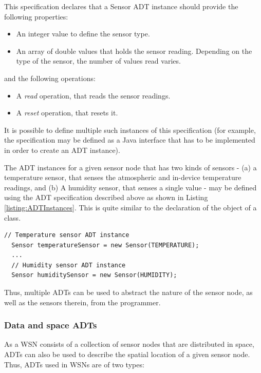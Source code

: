 This specification declares that a Sensor ADT instance should provide the
following properties:
\begin{itemize}
\item An integer value to define the sensor type.   
\item An array of double values that holds the sensor reading. Depending on the
type of the sensor, the number of values read varies.
\end{itemize}

and the following operations:
\begin{itemize}
  \item A \emph{read} operation, that reads the sensor readings.
  \item A \emph{reset} operation, that resets it.
\end{itemize}

It is possible to define multiple such instances of this specification (for
example, the specification may be defined as a Java interface that has to
be implemented in order to create an ADT instance).

The ADT instances for a given sensor node that has two kinds of
sensors - (a) a temperature sensor, that senses the atmospheric and in-device
  temperature readings, and (b) A humidity sensor, that senses a single value -
  may be defined using the ADT specification described above as shown in
  Listing \ref{listing:ADTInstances}. This is quite similar to the declaration
  of the object of a class.  

\begin{lstlisting}[frame=trbl, basewidth={0.55em, 0.6em}, captionpos=b,
basicstyle=\ttfamily\footnotesize, breaklines, caption = Sensor ADT instances, label =
listing:ADTInstance ]
  // Temperature sensor ADT instance
  Sensor temperatureSensor = new Sensor(TEMPERATURE);
  ...
  // Humidity sensor ADT instance  
  Sensor humiditySensor = new Sensor(HUMIDITY);
\end{lstlisting}

Thus, multiple ADTs can be used to abstract the nature of the
sensor node, as well as the sensors therein, from the programmer. 

\subsubsection{Data and space ADTs} \label{subsubsec:DataAndSpaceADTs}

As a WSN consists of a collection of sensor nodes that are distributed in
space, ADTs can also be used to describe the spatial location of a given
sensor node. Thus, ADTs used in WSNs are of two types:


